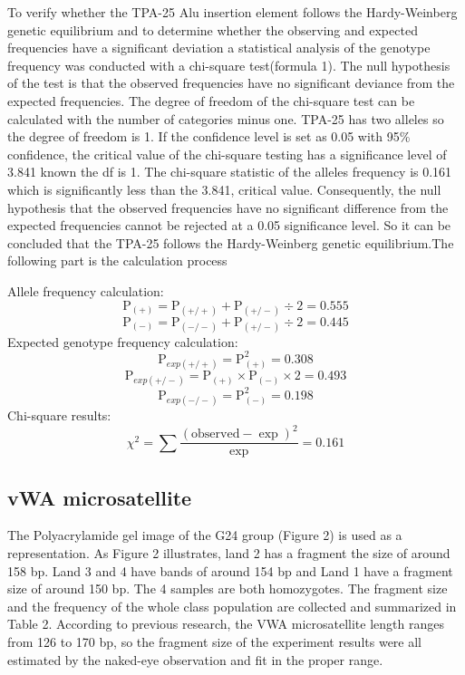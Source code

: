 \documentclass[a4paper,10pt]{article}
\begin{document}
\begin{multicols}{2}
To verify whether the TPA-25 Alu insertion element follows the Hardy-Weinberg genetic equilibrium and to determine whether the observing and expected frequencies have a significant deviation a statistical analysis of the genotype frequency was conducted with a chi-square test(formula 1). The null hypothesis of the test is that the observed frequencies have no significant deviance from the expected frequencies. The degree of freedom of the chi-square test can be calculated with the number of categories minus one. TPA-25 has two alleles so the degree of freedom is 1. If the confidence level is set as 0.05 with 95\% confidence, the critical value of the chi-square testing has a significance level of 3.841 known the df is 1. The chi-square statistic of the alleles frequency is 0.161 which is significantly less than the 3.841, critical value. Consequently, the null hypothesis that the observed frequencies have no significant difference from the expected frequencies cannot be rejected at a 0.05 significance level. So it can be concluded that the TPA-25 follows the Hardy-Weinberg genetic equilibrium.The following part is the calculation process


\setlength{\parindent}{0pt}Allele frequency calculation:
$$\mathrm{P}_{(+)}=\mathrm{P}_{(+/+)}+\mathrm{P}_{(+/-)}\div2=0.555$$
$$\mathrm{P}_{(-)}=\mathrm{P}_{(-/-)}+\mathrm{P}_{(+/-)}\div2=0.445$$
Expected genotype frequency calculation:
$$\mathrm{P}_{exp(+/+)}=\mathrm{P}_{(+)}^2=0.308$$
$$\mathrm{P}_{exp(+/-)}=\mathrm{P}_{(+)} \times \mathrm{P}_{(-)} \times 2 =0.493$$
$$\mathrm{P}_{exp(-/-)}=\mathrm{P}_{(-)}^2=0.198$$
Chi-square results:
\begin{equation}\chi^2=\sum\frac{(\text{observed}-\exp)^2}{\exp}=0.161\end{equation}


\subsection{vWA microsatellite}

The Polyacrylamide gel image of the G24 group (Figure 2) is used as a representation. As Figure 2 illustrates, land 2 has a fragment the size of around 158 bp. Land 3 and 4 have bands of around 154 bp and Land 1 have a fragment size of around 150 bp. The 4 samples are both homozygotes. The fragment size and the frequency of the whole class population are collected and summarized in Table 2. According to previous research, the VWA microsatellite length ranges from 126 to 170 bp, so the fragment size of the experiment results were all estimated by the naked-eye observation and fit in the proper range.


\end{multicols}
\end{document}
